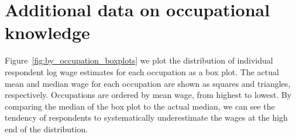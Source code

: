 \documentclass[12pt]{article}
\begin{document}

\section{Additional data on occupational knowledge} \label{sec:additional}

Figure~\ref{fig:by_occupation_boxplots} we plot the distribution of individual respondent log wage estimates for each occupation as a box plot. 
The actual mean and median wage for each occupation are shown as squares and triangles, respectively. 
Occupations are ordered by mean wage, from highest to lowest. 
By comparing the median of the box plot to the actual median, we can see the tendency of respondents to systematically underestimate the wages at the high end of the distribution.
\end{document}
